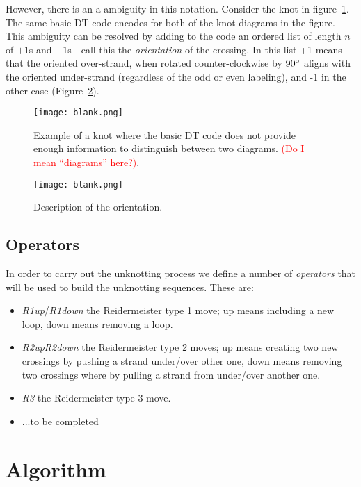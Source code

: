 \documentclass[a4paper,fleqn,11pt]{article}
\begin{document}
However, there is an a ambiguity in this notation. Consider the knot
in figure~\ref{fi:ambiguous}. The same basic DT code encodes for both
of the knot diagrams in the figure. This ambiguity can be resolved by
adding to the code an ordered list of length $n$ of $+1$s and
$-1$s---call this the \emph{orientation} of the crossing. In this list
+1 means that the oriented over-strand, when rotated counter-clockwise
by $90\degree$ aligns with the oriented under-strand (regardless of
the odd or even labeling), and -1 in the other case
(Figure~\ref{fi:orientation}).

\begin{figure}
  \texttt{[image: blank.png]}
  \caption{Example of a knot where the basic DT code does not provide
    enough information to distinguish between two
    diagrams. \textcolor{red}{(Do I mean ``diagrams'' here?)}.}
  \label{fi:ambiguous}
\end{figure}

\begin{figure}
  \texttt{[image: blank.png]}
  \caption{Description of the orientation.}
  \label{fi:orientation}
\end{figure}

\subsection{Operators}

In order to carry out the unknotting process we define a number of
\emph{operators} that will be used to build the unknotting
sequences. These are:
\begin{itemize}\addtolength{\itemsep}{-0.5\baselineskip}
  \item \emph{R1up}/\emph{R1down} the Reidermeister type 1 move; up
    means including a new loop, down means removing a loop.
  \item \emph{R2up}\emph{R2down} the Reidermeister type 2 moves; up
    means creating two new crossings by pushing a strand under/over
    other one, down means removing two crossings where by pulling a
    strand from under/over another one.
  \item \emph{R3} the Reidermeister type 3 move.
  \item ...to be completed
\end{itemize}

\section{Algorithm}
\end{document}
